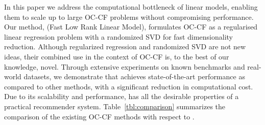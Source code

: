In this paper we address the computational bottleneck of linear models, enabling them to scale up to large OC-CF problems without compromising performance. Our method, \LinearLow (Fast Low Rank Linear Model), formulates OC-CF as a regularised linear regression problem with a randomized SVD for fast dimensionality reduction. 
Although regularized regression and randomized SVD are not new ideas,  their combined use in the context of OC-CF is,  to the best of our knowledge, novel. 
Through extensive experiments on known benchmarks and real-world datasets, we demonstrate that \LinearLow achieves state-of-the-art performance as 
compared to other methods, with a significant reduction in computational cost.  Due to its scalability and performance, 
\LinearLow has all the desirable properties of a practical recommender system. Table~\ref{tbl:comparison} summarizes the comparison of the existing OC-CF methods with respect to \LinearLow.


